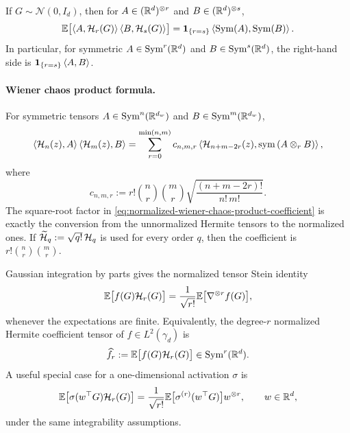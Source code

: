If $G\sim\mathcal N(0,I_d)$, then for $A\in(\mathbb{R}^d)^{\otimes r}$ and
$B\in(\mathbb{R}^d)^{\otimes s}$,
\begin{equation}
\label{eq:normalized-hermite-tensor-orthogonality}
\mathbb{E}\bigl[
\left\langle A,\mathcal{H}_r(G)\right\rangle
\left\langle B,\mathcal{H}_s(G)\right\rangle
\bigr]
=
\mathbf{1}_{\{r=s\}}
\left\langle \mathrm{Sym}(A),\mathrm{Sym}(B)\right\rangle.
\end{equation}
In particular, for symmetric $A\in\mathrm{Sym}^r(\mathbb{R}^d)$ and $B\in\mathrm{Sym}^s(\mathbb{R}^d)$, the right-hand side is
$\mathbf{1}_{\{r=s\}}\left\langle A,B\right\rangle$.

\paragraph{Wiener chaos product formula.}
For symmetric tensors $A\in\mathrm{Sym}^n(\mathbb{R}^{d_w})$ and $B\in\mathrm{Sym}^m(\mathbb{R}^{d_w})$,
\begin{equation}
\label{eq:normalized-hermite-tensor-product-formula}
    \left\langle \mathcal{H}_n(z),A\right\rangle
    \left\langle \mathcal{H}_m(z),B\right\rangle
    =
    \sum_{r=0}^{\min(n,m)}
    c_{n,m,r}
    \left\langle 
        \mathcal{H}_{n+m-2r}(z)
    ,
        \mathrm{sym}\left({A\otimes_{r}B}\right)
    \right\rangle,
\end{equation}
where
\begin{equation}
\label{eq:normalized-wiener-chaos-product-coefficient}
    c_{n,m,r}
    :=
    r!\binom nr\binom mr
    \sqrt{\frac{(n+m-2r)!}{n!\,m!}} .
\end{equation}
The square-root factor in \cref{eq:normalized-wiener-chaos-product-coefficient} is exactly the
conversion from the unnormalized Hermite tensors to the normalized ones.  If
$\widetilde{\mathcal{H}}_q:=\sqrt{q!}\,\mathcal{H}_q$ is used for every order $q$, then the coefficient
is $r!\binom nr\binom mr$.

Gaussian integration by parts gives the normalized tensor Stein identity
\[
\mathbb{E}\bigl[f(G)\mathcal{H}_r(G)\bigr]
=
\frac1{\sqrt{r!}}\mathbb{E}\bigl[\nabla^{\otimes r}f(G)\bigr],
\]
whenever the expectations are finite.  Equivalently, the degree-$r$ normalized Hermite coefficient
tensor of $f\in L^2(\gamma_d)$ is
\[
\widehat f_r:=\mathbb{E}\bigl[f(G)\mathcal{H}_r(G)\bigr]
\in\mathrm{Sym}^r(\mathbb{R}^d).
\]
A useful special case for a one-dimensional activation $\sigma$ is
\[
\mathbb{E}\bigl[\sigma(w^\top G)\mathcal{H}_r(G)\bigr]
=
\frac1{\sqrt{r!}}\mathbb{E}\bigl[\sigma^{(r)}(w^\top G)\bigr]w^{\otimes r},
\qquad
w\in\mathbb{R}^d,
\]
under the same integrability assumptions.
